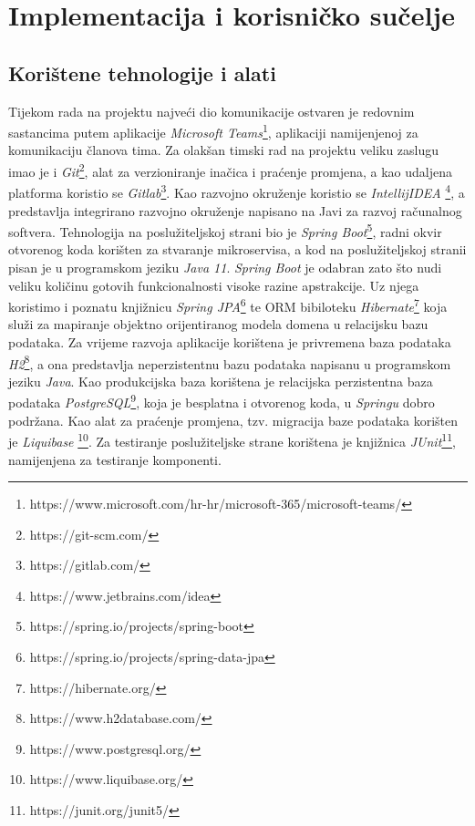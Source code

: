 \chapter{Implementacija i korisničko sučelje}
		
		
		\section{Korištene tehnologije i alati}
		
			 Tijekom rada na projektu najveći dio komunikacije ostvaren je redovnim sastancima putem aplikacije \textit{Microsoft Teams}\footnote{https://www.microsoft.com/hr-hr/microsoft-365/microsoft-teams/}, aplikaciji namijenjenoj za komunikaciju članova tima. Za olakšan timski rad na projektu veliku zaslugu imao je i \textit{Git}\footnote{https://git-scm.com/}, alat za verzioniranje inačica i praćenje promjena, a kao udaljena platforma koristio se \textit{Gitlab}\footnote{https://gitlab.com/}.\newline
			  Kao razvojno okruženje koristio se \textit{IntellijIDEA} \footnote{https://www.jetbrains.com/idea}, a predstavlja integrirano razvojno okruženje napisano na Javi za razvoj računalnog softvera. Tehnologija na poslužiteljskoj strani bio je \textit{Spring Boot}\footnote{https://spring.io/projects/spring-boot}, radni okvir otvorenog koda korišten za stvaranje mikroservisa, a kod na poslužiteljskoj stranii pisan je u programskom jeziku \textit{Java 11}. \textit{Spring Boot} je odabran zato što nudi veliku količinu gotovih funkcionalnosti visoke razine apstrakcije. Uz njega koristimo i poznatu knjižnicu \textit{Spring JPA}\footnote{https://spring.io/projects/spring-data-jpa} te ORM bibiloteku \textit{Hibernate}\footnote{https://hibernate.org/} koja služi za mapiranje objektno orijentiranog modela domena u relacijsku bazu podataka. Za vrijeme razvoja aplikacije korištena je privremena baza podataka \textit{H2}\footnote{https://www.h2database.com/}, a ona predstavlja neperzistentnu bazu podataka napisanu u programskom jeziku \textit{Java}. Kao produkcijska baza korištena je relacijska perzistentna baza podataka \textit{PostgreSQL}\footnote{https://www.postgresql.org/}, koja je besplatna i otvorenog koda, u \textit{Springu} dobro podržana. Kao alat za praćenje promjena, tzv. migracija baze podataka korišten je \textit{Liquibase} \footnote{https://www.liquibase.org/}. Za testiranje poslužiteljske strane korištena je knjižnica \textit{JUnit}\footnote{https://junit.org/junit5/}, namijenjena za testiranje komponenti.
